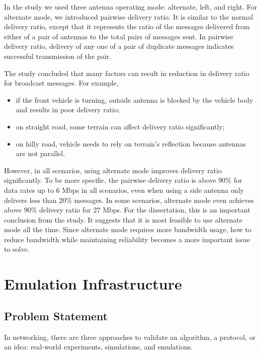 \documentclass[12pt]{report}
\begin{document}
In the study we used three antenna operating mode: alternate, left, and right. For alternate mode, we introduced pairwise delivery ratio. It is similar to the normal delivery ratio, except that it represents the ratio of the messages delivered from either of a pair of antennas to the total pairs of messages sent. In pairwise delivery ratio, delivery of any one of a pair of duplicate messages indicates successful transmission of the pair. 

The study concluded that many factors can result in reduction in delivery ratio for broadcast messages. For example,

\begin{itemize}
  \item if the front vehicle is turning, outside antenna is blocked by the vehicle body and results in poor delivery ratio;
  \item on straight road, some terrain can affect delivery ratio significantly;
  \item on hilly road, vehicle needs to rely on terrain's reflection because antennas are not parallel.
\end{itemize}

However, in all scenarios, using alternate mode improves delivery ratio significantly. To be more specific, the pairwise delivery ratio is above $90\%$ for data rates up to 6 Mbps in all scenarios, even when using a side antenna only delivers less than $20\%$ messages. In some scenarios, alternate mode even achieves above $90\%$ delivery ratio for 27 Mbps. \cite{songDSRC2016} For the dissertation, this is an important conclusion from the study. It suggests that it is most feasible to use alternate mode all the time. Since alternate mode requires more bandwidth usage, how to reduce bandwidth while maintaining reliability becomes a more important issue to solve.

\chapter{Emulation Infrastructure}

\section{Problem Statement}
\label{sec:problem_validation}

In networking, there are three approaches to validate an algorithm, a protocol, or an idea: real-world experiments, simulations, and emulations.
\end{document}
